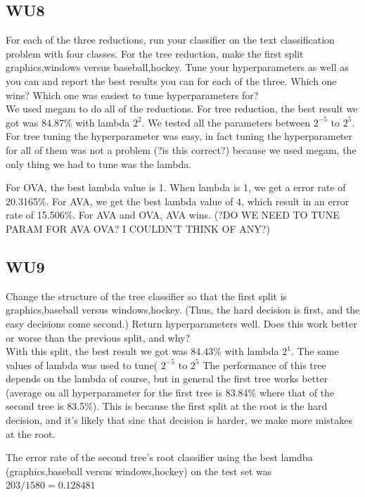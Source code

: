 \documentclass[a4paper,11pt]{article}
\begin{document}
\subsection{WU8}
\textsf{For each of the three reductions, run your classifier on the
text classification problem with four classes. For the tree reduction, 
make the first split {graphics,windows} versus {baseball,hockey}. 
Tune your hyperparameters as well as you can and report the best 
results you can for each of the three. Which one wins? Which one was 
easiest to tune hyperparameters for?}\\

We used megam to do all of the reductions.
For tree reduction, the best result we got was 84.87\% with lambda
$2^2$. We tested all the parameters between $2^{-5}$ to $2^{5}$. For
tree tuning the hyperparameter was easy, in fact tuning the
hyperparameter for all of them was not a problem (?is this correct?)
because we used megam, the only thing we had to tune was the lambda.

For OVA, the best lambda value is 1. When lambda is 1, we get a error rate of 20.3165\%. For AVA, we get the best lambda value of 4, which result in an error rate of 15.506\%. For AVA and OVA, AVA wins.
 (?DO WE NEED TO TUNE PARAM FOR AVA OVA? I COULDN'T THINK OF ANY?) 


\subsection{WU9}
\textsf{Change the structure of the tree classifier so that the first
  split is {graphics,baseball} versus {windows,hockey}. (Thus, the
  hard decision is first, and the easy decisions come second.) Return
  hyperparameters well. Does this work better or worse than the
  previous split, and why?}\\

With this split, the best result we got was 84.43\% with lambda
$2^1$. The same values of lambda was used to tune( $2^{-5}$ to $2^{5}$
The performance of this tree depends on the lambda  of course, but in
general the first tree works better (average on all hyperparameter for
the first tree is 83.84\% where that of the second tree is 83.5\%). This is because the
first split at the root is the hard decision, and it's likely that
sinc that decision is harder, we make more mistakes at the root. 

The error rate of the second tree's root classifier
using the best lamdba ({graphics,baseball}
versus {windows,hockey}) on the test set was $203 / 1580 = 0.128481$
\end{document}
